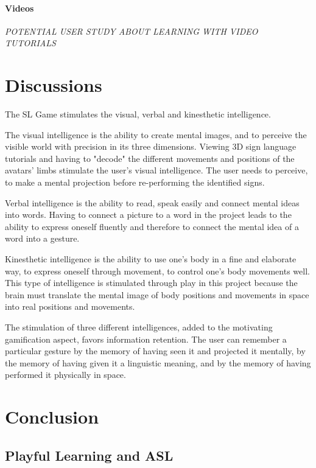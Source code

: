\paragraph{Videos}

\textit{POTENTIAL USER STUDY ABOUT LEARNING WITH VIDEO TUTORIALS}

\section{Discussions}

The SL Game stimulates the visual, verbal and kinesthetic intelligence. 

The visual intelligence is the ability to create mental images, and to perceive the visible world with precision in its three dimensions. Viewing 3D sign language tutorials and having to "decode" the different movements and positions of the avatars' limbs stimulate the user's visual intelligence. The user needs to perceive, to make a mental projection before re-performing the identified signs.

Verbal intelligence is the ability to read, speak easily and connect mental ideas into words. Having to connect a picture to a word in the project leads to the ability to express oneself fluently and therefore to connect the mental idea of a word into a gesture. 

Kinesthetic intelligence is the ability to use one's body in a fine and elaborate way, to express oneself through movement, to control one's body movements well. This type of intelligence is stimulated through play in this project because the brain must translate the mental image of body positions and movements in space into real positions and movements. 

The stimulation of three different intelligences, added to the motivating gamification aspect, favors information retention. The user can remember a particular gesture by the memory of having seen it and projected it mentally, by the memory of having given it a linguistic meaning, and by the memory of having performed it physically in space.

\section{Conclusion}

\subsection{Playful Learning and ASL}

